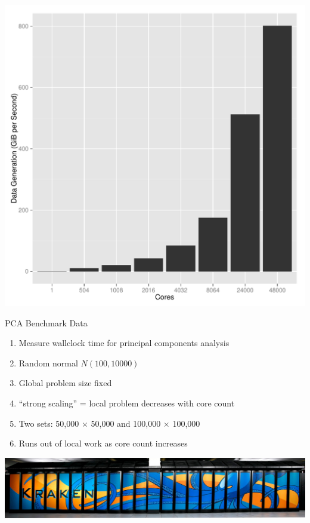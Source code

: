 \begin{frame}
  \begin{block}{}
  \begin{center}
    \includegraphics[height=.88\textheight]{../common/pics/benchmarks/datagen24k}
  \end{center}
  \end{block}
\end{frame}

\begin{frame}
  \begin{block}{PCA Benchmark Data}
    \begin{enumerate}[<+-|alert@+>]
      \item Measure wallclock time for principal components analysis
      \item Random normal $N(100, 10000)$
      \item Global problem size fixed
      \item ``strong scaling'' = local problem decreases with core count
      \item Two sets: 50,000 $\times$ 50,000 and 100,000 $\times$ 100,000
      \item Runs out of local work as core count increases
    \end{enumerate}
    \vspace{.8cm}
    \centering\includegraphics{../common/pics/krakenWide}
  \end{block}
\end{frame}

